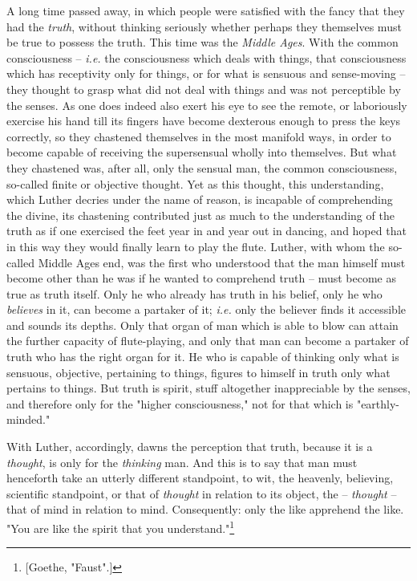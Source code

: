 \documentclass[a4paper]{book}
\begin{document}
A long time passed away, in which people were satisfied with the fancy that 
they had the \textit{truth}, without thinking seriously whether perhaps they 
themselves must be true to possess the truth. This time was the \textit{Middle 
Ages}. With the common consciousness -- \textit{i.e.} the consciousness which 
deals with things, that consciousness which has receptivity only for things, 
or for what is sensuous and sense-moving -- they thought to grasp what did not 
deal with things and was not perceptible by the senses. As one does indeed 
also exert his eye to see the remote, or laboriously exercise his hand till 
its fingers have become dexterous enough to press the keys correctly, so they 
chastened themselves in the most manifold ways, in order to become capable of 
receiving the supersensual wholly into themselves. But what they chastened 
was, after all, only the sensual man, the common consciousness, so-called 
finite or objective thought. Yet as this thought, this understanding, which 
Luther decries under the name of reason, is incapable of comprehending the 
divine, its chastening contributed just as much to the understanding of the 
truth as if one exercised the feet year in and year out in dancing, and hoped 
that in this way they would finally learn to play the flute. Luther, with whom 
the so-called Middle Ages end, was the first who understood that the man 
himself must become other than he was if he wanted to comprehend truth -- must 
become as true as truth itself. Only he who already has truth in his belief, 
only he who \textit{believes} in it, can become a partaker of it; 
\textit{i.e.} only the believer finds it accessible and sounds its depths. 
Only that organ of man which is able to blow can attain the further capacity 
of flute-playing, and only that man can become a partaker of truth who has the 
right organ for it. He who is capable of thinking only what is sensuous, 
objective, pertaining to things, figures to himself in truth only what 
pertains to things. But truth is spirit, stuff altogether inappreciable by the 
senses, and therefore only for the "{}higher consciousness,"{} not for that 
which is "{}earthly-minded."{}

With Luther, accordingly, dawns the perception that truth, because it is a 
\textit{thought}, is only for the \textit{thinking} man. And this is to say 
that man must henceforth take an utterly different standpoint, to wit, the 
heavenly, believing, scientific standpoint, or that of \textit{thought} in 
relation to its object, the -- \textit{thought} -- that of mind in relation to 
mind. Consequently: only the like apprehend the like. "{}You are like the 
spirit that you understand."{}\footnote{[Goethe, "{}Faust"{}.]}
\end{document}
